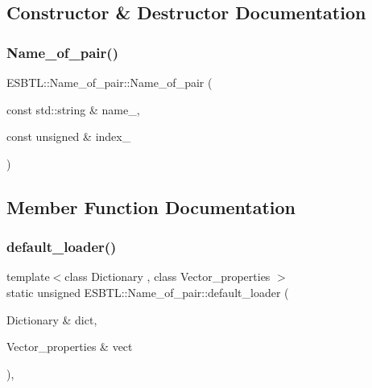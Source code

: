 \subsection{Constructor \& Destructor Documentation}
\mbox{\label{classESBTL_1_1Name__of__pair_a93ea9cdffb72da75fb945a77750acf82}} 
\subsubsection{\texorpdfstring{Name\+\_\+of\+\_\+pair()}{Name\_of\_pair()}}
{\footnotesize\ttfamily E\+S\+B\+T\+L\+::\+Name\+\_\+of\+\_\+pair\+::\+Name\+\_\+of\+\_\+pair (\begin{DoxyParamCaption}\item[{const std\+::string \&}]{name\+\_\+,  }\item[{const unsigned \&}]{index\+\_\+ }\end{DoxyParamCaption})\hspace{0.3cm}{\ttfamily [inline]}}



\subsection{Member Function Documentation}
\mbox{\label{classESBTL_1_1Name__of__pair_a72aed6b4391404f30ac1e4eccb7ce14a}} 
\subsubsection{\texorpdfstring{default\+\_\+loader()}{default\_loader()}}
{\footnotesize\ttfamily template$<$class Dictionary , class Vector\+\_\+properties $>$ \\
static unsigned E\+S\+B\+T\+L\+::\+Name\+\_\+of\+\_\+pair\+::default\+\_\+loader (\begin{DoxyParamCaption}\item[{Dictionary \&}]{dict,  }\item[{Vector\+\_\+properties \&}]{vect }\end{DoxyParamCaption})\hspace{0.3cm}{\ttfamily [inline]}, {\ttfamily [static]}}

